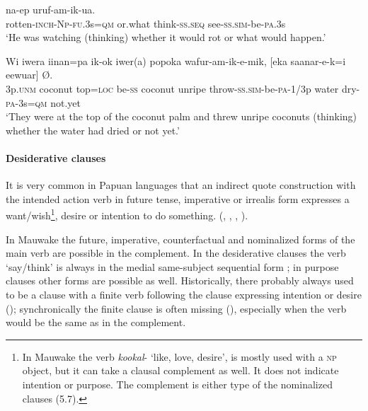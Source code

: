 \ea%
\label{ex:x1591}
\gll [Beel-al-i-non=i  kamenion]  na-ep uruf-am-ik-ua.\\
rotten-\textsc{inch}-\textsc{Np}-\textsc{fu}.3s=\textsc{qm} or.what  think-\textsc{ss}.\textsc{seq} see-\textsc{ss}.\textsc{sim}-be-\textsc{pa}.3s\\
\glt`He was watching (thinking) whether it would rot or what would happen.'
\z


\ea%
\label{ex:x1593}
\gll Wi  iwera  iinan=pa  ik-ok  iwer(a)  popoka wafur-am-ik-e-mik,  [eka  saanar-e-k=i  eewuar] {\O}. \\
3p.\textsc{unm} coconut top=\textsc{loc} be-\textsc{ss} coconut unripe throw-\textsc{ss}.\textsc{sim}-be-\textsc{pa}-1/3p water dry-\textsc{pa}-3s=\textsc{qm} not.yet\\
\glt`They were at the top of the coconut palm and threw unripe coconuts (thinking) whether the water had dried or not yet.'
\z


\paragraph[Desiderative clauses]{Desiderative clauses}

It is very common in Papuan languages that an indirect quote construction with the intended action verb in future tense, imperative or irrealis form expresses a want/wish\footnote{In Mauwake the verb \textit{kookal}- `like, love, desire', is mostly used with a \textsc{np} object, but it can take a clausal complement as well. It does not indicate intention or purpose. The complement is either type of the nominalized clauses (5.7).}, desire or intention to do something. (\citealt[254--259]{Reesink1987}, \citealt[157]{Foley1986}, \citealt[112]{Hardin2003}, \citealt[76--77]{Hepner2002}).

In Mauwake the future, imperative, counterfactual and nominalized forms of the main verb are possible in the complement. In the desiderative clauses the verb  `say/think' is always in the medial same-subject sequential form ; in purpose clauses other forms are possible as well. Historically, there probably always used to be a clause with a finite verb following the clause expressing intention or desire (); synchronically the finite clause is often missing (), especially when the verb would be the same as in the complement.

